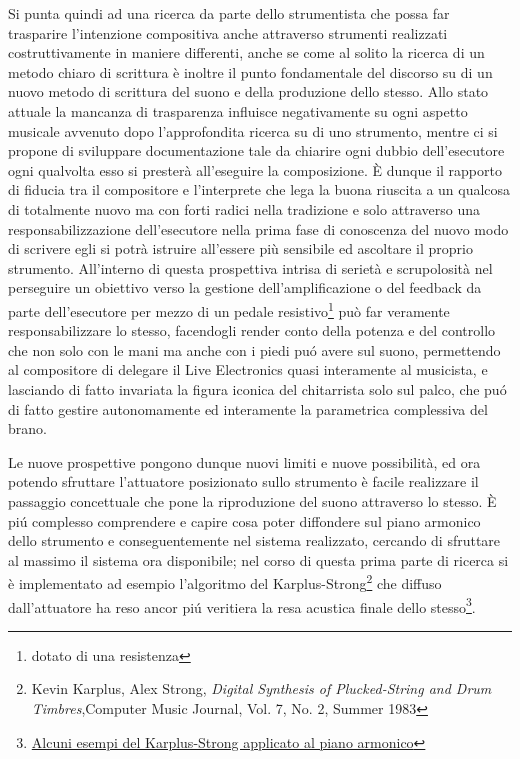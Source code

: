 \documentclass[oneside]{article}
\begin{document}
\begin{multicols*}{2}
Si punta quindi ad una ricerca da parte dello strumentista che possa far trasparire l'intenzione compositiva anche attraverso strumenti realizzati costruttivamente in maniere differenti, anche se come al solito la ricerca di un metodo chiaro di scrittura è inoltre il punto fondamentale del discorso su di un nuovo metodo di scrittura del suono e della produzione dello stesso. Allo stato attuale la mancanza di trasparenza influisce negativamente su ogni aspetto musicale avvenuto dopo l'approfondita ricerca su di uno strumento, mentre ci si propone di sviluppare documentazione tale da chiarire ogni dubbio dell'esecutore ogni qualvolta esso si presterà all'eseguire la composizione. È dunque il rapporto di fiducia tra il compositore e l'interprete che lega la buona riuscita a un qualcosa di totalmente nuovo ma con forti radici nella tradizione e solo attraverso una responsabilizzazione dell'esecutore nella prima fase di conoscenza del nuovo modo di scrivere egli si potrà istruire all'essere più sensibile ed ascoltare il proprio strumento. All'interno di questa prospettiva intrisa di serietà e scrupolosità nel perseguire un obiettivo verso la gestione dell'amplificazione o del feedback da parte dell'esecutore per mezzo di un pedale resistivo\footnote{dotato di una resistenza} può far veramente responsabilizzare lo stesso, facendogli render conto della potenza e del controllo che non solo con le mani ma anche con i piedi puó avere sul suono, permettendo al compositore di delegare il Live Electronics quasi interamente al musicista, e lasciando di fatto invariata la figura iconica del chitarrista solo sul palco, che puó di fatto gestire autonomamente ed interamente la parametrica complessiva del brano.\newline

Le nuove prospettive pongono dunque nuovi limiti e nuove possibilità, ed ora potendo sfruttare l'attuatore posizionato sullo strumento è facile realizzare il passaggio concettuale che pone la riproduzione del suono attraverso lo stesso. È piú complesso comprendere e capire cosa poter diffondere sul piano armonico dello strumento e conseguentemente nel sistema realizzato, cercando di sfruttare al massimo il sistema ora disponibile; nel corso di questa prima parte di ricerca si è implementato  ad esempio l'algoritmo del Karplus-Strong\footnote{Kevin Karplus, Alex Strong, \emph{Digital Synthesis of Plucked-String and Drum Timbres},Computer Music Journal, Vol. 7, No. 2, Summer 1983} che diffuso dall'attuatore ha reso ancor piú veritiera la resa acustica finale dello stesso\footnote{\href{https://github.com/SMERM/BN-Tedesco/tree/master/COME-02/Lezioni_in_Compresenza/20200331/Esempi_Karplus-Strong_Attuatore_su_chitarra}{Alcuni esempi del Karplus-Strong applicato al piano armonico}}.


\end{multicols*}
\end{document}
